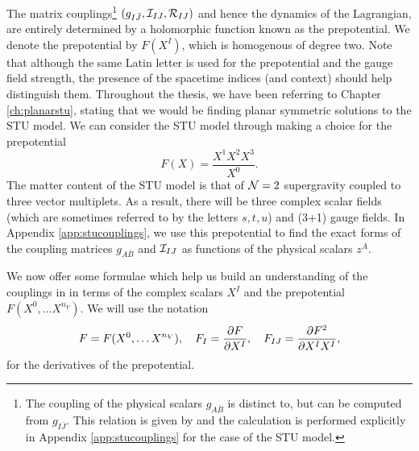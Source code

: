The matrix couplings\footnote{The coupling of the physical scalars $g_{A\bar{B}}$ is distinct to, but can be computed from $g_{I\bar{J}}$. This relation is given by  and the calculation is performed explicitly in Appendix \ref{app:stucouplings} for the case of the STU model.} $(g_{I\bar{J}}, {\cal I}_{IJ}, {\cal R}_{IJ})$ and hence the dynamics of the Lagrangian, are entirely determined by a holomorphic function known as the prepotential. We denote the prepotential by $F(X^I)$, which is homogenous of degree two. Note that although the same Latin letter is used for the prepotential and the gauge field strength, the presence of the spacetime indices (and context) should help distinguish them. Throughout the thesis, we have been referring to Chapter \ref{ch:planarstu}, stating that we would be finding planar symmetric solutions to the STU model. We can consider the STU model through making a choice for the prepotential \cite{Duff:1995sm}
\begin{equation}
\label{eq:stuprepotential}
	F(X) = \frac{X^1 X^2 X^3}{X^0}.
\end{equation}
The matter content of the STU model is that of ${\cal N} = 2$ supergravity coupled to three vector multiplets. As a result, there will be three complex scalar fields (which are sometimes referred to by the letters $s,t,u$) and (3+1) gauge fields. In Appendix \ref{app:stucouplings}, we use this prepotential to find the exact forms of the coupling matrices $g_{A\bar{B}}$ and ${\cal I}_{IJ}$ as functions of the physical scalars $z^A$.

We now offer some formulae which help us build an understanding of the couplings in  in terms of the complex scalars $X^I$ and the prepotential $F(X^0, \ldots X^{n_V})$. We will use the notation
\begin{equation*}
	F = F(X^0, \ldots X^{n_V}), \quad F_I = \frac{\partial F}{\partial X^I}, \quad F_{IJ} = \frac{\partial F^2}{\partial X^I X^I},
\end{equation*}
for the derivatives of the prepotential.


